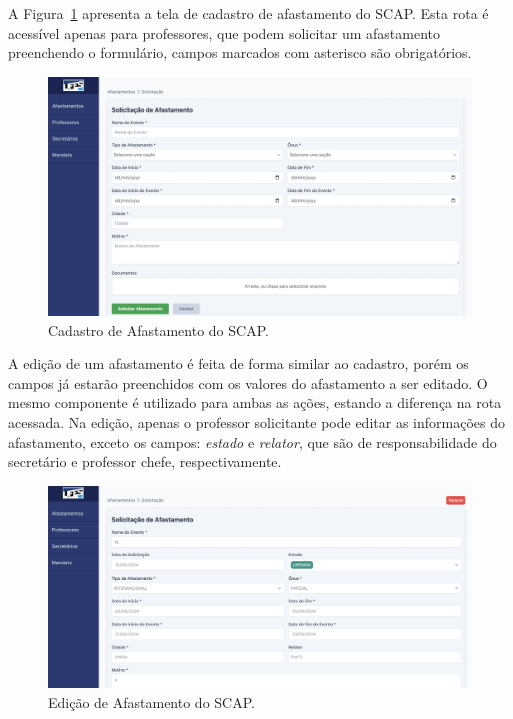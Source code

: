 A Figura~\ref{fig-cadastro-afastamento} apresenta a tela de cadastro de afastamento do SCAP. Esta rota
é acessível apenas para professores, que podem solicitar um afastamento preenchendo o formulário,
campos marcados com asterisco são obrigatórios. 

\begin{figure}[h!]
    \centering
    \includegraphics[width=\textwidth]{figuras/prints-app/fig-solicitar-afastamento.png}
    \caption{Cadastro de Afastamento do SCAP.}
    \label{fig-cadastro-afastamento}
\end{figure}

A edição de um afastamento é feita de forma similar ao cadastro, porém os campos já estarão preenchidos com os valores
do afastamento a ser editado. O mesmo componente é utilizado para ambas as ações, estando a diferença na rota acessada.
Na edição, apenas o professor solicitante pode editar as informações do afastamento, exceto os campos:
\textit{estado} e \textit{relator}, que são de responsabilidade do secretário e professor chefe, respectivamente.

\begin{figure}
    \centering
    \includegraphics[width=\textwidth]{figuras/prints-app/fig-editar-afastamento.png}
    \caption{Edição de Afastamento do SCAP.}
    \label{fig-editar-afastamento}
\end{figure}

